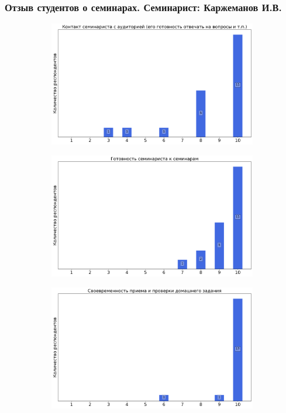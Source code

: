 	\subsubsection{Отзыв студентов о семинарах. Семинарист: Каржеманов И.В.}
		\begin{figure}[H]
			\centering
			\begin{subfigure}[b]{0.45\textwidth}
				\centering
				\includegraphics[width=\textwidth]{images/1 course/Математический анализ/seminarists-marks-Каржеманов И.В.-0.png}
			\end{subfigure}
			\begin{subfigure}[b]{0.45\textwidth}
				\centering
				\includegraphics[width=\textwidth]{images/1 course/Математический анализ/seminarists-marks-Каржеманов И.В.-1.png}
			\end{subfigure}
			\begin{subfigure}[b]{0.45\textwidth}
				\centering
				\includegraphics[width=\textwidth]{images/1 course/Математический анализ/seminarists-marks-Каржеманов И.В.-2.png}

\end{subfigure}
\end{figure}
